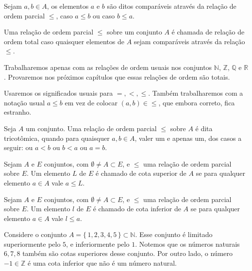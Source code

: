 \documentclass[../main.tex]{subfiles}
\begin{document}
\begin{defi}
    Sejam $a,b \in A$, os elementos $a$ e $b$ são ditos comparáveis através da relação de ordem parcial $\leq$, caso $a \leq b$ ou caso $b \leq a$. 
\end{defi}

\begin{defi}\label{agb-def-relacaoOrdemTotal}
    Uma relação de ordem parcial $\leq$ sobre um conjunto $A$ é chamada de relação de ordem total caso quaisquer elementos de $A$ sejam comparáveis através da relação $\leq$.
\end{defi}


Trabalharemos apenas com as relações de ordem usuais nos conjuntos $\mathbb{N}$, $\mathbb{Z}$, $\mathbb{Q}$ e $\mathbb{R}$. Provaremos nos próximos capítulos que essas relações de ordem são totais.

Usaremos os significados usuais para $=, <, \leq$. Também trabalharemos com a notação usual $a \leq b$ em vez de colocar $(a,b) \in \leq$, que embora correto, fica estranho. 

\begin{defi}\label{agb-def-relacaoTricotomica}
    Seja $A$ um conjunto. Uma relação de ordem parcial $\leq$ sobre $A$ é dita tricotômica,
    quando para quaisquer $a,b \in A$, valer um e apenas um, dos casos a seguir: ou $a < b$ ou $b < a$ ou $a = b$.
\end{defi}

\begin{defi}\label{agb-def-cotaSuperior}
    Sejam $A$ e $E$ conjuntos, com $\emptyset \neq A \subset E$, e $\leq$ uma relação de ordem parcial sobre $E$. Um elemento $L$ de $E$ é chamado de cota superior de $A$ se para qualquer elemento $a \in A$ vale $a \leq L$.
\end{defi}

\begin{defi}\label{agb-def-cotaInferior}
    Sejam $A$ e $E$ conjuntos, com $\emptyset \neq A \subset E$, e $\leq$ uma relação de ordem parcial sobre $E$. Um elemento $l$ de $E$ é chamado de cota inferior de $A$ se para qualquer elemento $a \in A$ vale $l \leq a$.
\end{defi}
\begin{ex}\label{agb-ex-cotasSuperiorInferior}
    Considere o conjunto $A = \{\,1,2,3,4,5\,\} \subset \mathbb{N}$. Esse conjunto é limitado superiormente pelo $5$, e inferiormente pelo $1$. Notemos que os números naturais $6,7,8$ também são cotas superiores desse conjunto. Por outro lado, o número $-1 \in \mathbb{Z}$ é uma cota inferior que não é um número natural. 
\end{ex}
\end{document}
